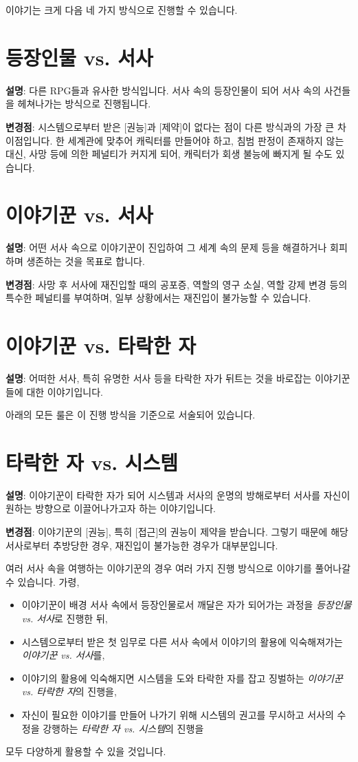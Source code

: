 \documentclass{report}
\begin{document}
	
	이야기는 크게 다음 네 가지 방식으로 진행할 수 있습니다.
	
	\section*{등장인물 vs. 서사}
	\textbf{설명}: 다른 RPG들과 유사한 방식입니다. 서사 속의 등장인물이 되어 서사 속의 사건들을 헤쳐나가는 방식으로 진행됩니다.
	
	\textbf{변경점}: 시스템으로부터 받은 [권능]과 [제약]이 없다는 점이 다른 방식과의 가장 큰 차이점입니다. 한 세계관에 맞추어 캐릭터를 만들어야 하고, 침범 판정이 존재하지 않는 대신, 사망 등에 의한 페널티가 커지게 되어, 캐릭터가 회생 불능에 빠지게 될 수도 있습니다.
	
	\section*{이야기꾼 vs. 서사}
	\textbf{설명}: 어떤 서사 속으로 이야기꾼이 진입하여 그 세계 속의 문제 등을 해결하거나 회피하며 생존하는 것을 목표로 합니다.
	
	\textbf{변경점}: 사망 후 서사에 재진입할 때의 공포증, 역할의 영구 소실, 역할 강제 변경 등의 특수한 페널티를 부여하며, 일부 상황에서는 재진입이 불가능할 수 있습니다.
	
	\section*{이야기꾼 vs. 타락한 자}
	\textbf{설명}: 어떠한 서사, 특히 유명한 서사 등을 타락한 자가 뒤트는 것을 바로잡는 이야기꾼들에 대한 이야기입니다.
	
	아래의 모든 룰은 이 진행 방식을 기준으로 서술되어 있습니다.
	
	\section*{타락한 자 vs. 시스템}
	\textbf{설명}: 이야기꾼이 타락한 자가 되어 시스템과 서사의 운명의 방해로부터 서사를 자신이 원하는 방향으로 이끌어나가고자 하는 이야기입니다.
	
	\textbf{변경점}: 이야기꾼의 [권능], 특히 [접근]의 권능이 제약을 받습니다. 그렇기 때문에 해당 서사로부터 추방당한 경우, 재진입이 불가능한 경우가 대부분입니다.
	
	\bigskip
	
	여러 서사 속을 여행하는 이야기꾼의 경우 여러 가지 진행 방식으로 이야기를 풀어나갈 수 있습니다. 가령,
	\begin{itemize}
		\item 이야기꾼이 배경 서사 속에서 등장인물로서 깨달은 자가 되어가는 과정을 \emph{등장인물 vs. 서사}로 진행한 뒤,
		\item 시스템으로부터 받은 첫 임무로 다른 서사 속에서 이야기의 활용에 익숙해져가는 \emph{이야기꾼 vs. 서사}를,
		\item 이야기의 활용에 익숙해지면 시스템을 도와 타락한 자를 잡고 징벌하는 \emph{이야기꾼 vs. 타락한 자}의 진행을,
		\item 자신이 필요한 이야기를 만들어 나가기 위해 시스템의 권고를 무시하고 서사의 수정을 강행하는 \emph{타락한 자 vs. 시스템}의 진행을
	\end{itemize}
	모두 다양하게 활용할 수 있을 것입니다.
	
\end{document}
